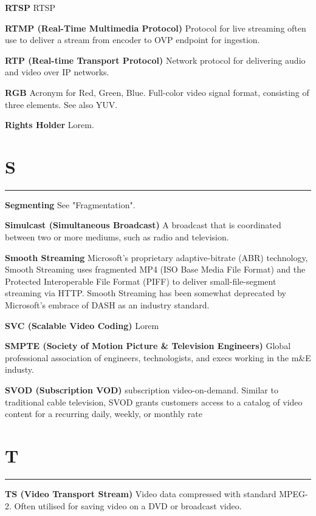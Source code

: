 \smallskip
\textbf{RTSP}
RTSP

\smallskip
\textbf{RTMP (Real-Time Multimedia Protocol)}
Protocol for live streaming often use to deliver a stream from encoder to OVP endpoint for ingestion.

\smallskip
\textbf{RTP (Real-time Transport Protocol)}
Network protocol for delivering audio and video over IP networks.

\smallskip
\textbf{RGB}
Acronym for Red, Green, Blue. Full-color video signal format, consisting of three elements. See also YUV.

\smallskip
\textbf{Rights Holder}
Lorem.

\section{S}
\hrule

\medskip
\textbf{Segmenting}
See "Fragmentation".

\smallskip
\textbf{Simulcast (Simultaneous Broadcast)}
A broadcast that is coordinated between two or more mediums, such as radio and television.

\smallskip
\textbf{Smooth Streaming}
Microsoft’s proprietary adaptive-bitrate (ABR) technology, Smooth Streaming uses fragmented MP4 (ISO Base Media File Format) and the Protected Interoperable File Format (PIFF) to deliver small-file-segment streaming via HTTP. Smooth Streaming has been somewhat deprecated by Microsoft’s embrace of DASH as an industry standard.

\smallskip
\textbf{SVC (Scalable Video Coding)}
Lorem

\smallskip
\textbf{SMPTE (Society of Motion Picture \& Television Engineers)}
Global professional association of engineers, technologists, and execs working in the m\&E industy.

\smallskip
\textbf{SVOD (Subscription VOD)}
subscription video-on-demand. Similar to traditional cable television, SVOD grants customers access to a catalog of video content for a recurring daily, weekly, or monthly rate


\section{T}
\hrule

\medskip
\textbf{TS (Video Transport Stream)}
Video data compressed with standard MPEG-2. Often utilised for saving video on a DVD or broadcast video.


